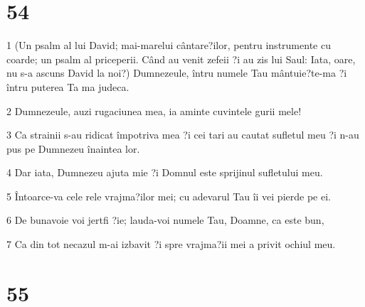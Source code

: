 \chapter{54}

\par 1 (Un psalm al lui David; mai-marelui cântare?ilor, pentru instrumente cu coarde; un psalm al priceperii. Când au venit zefeii ?i au zis lui Saul: Iata, oare, nu s-a ascuns David la noi?) Dumnezeule, întru numele Tau mântuie?te-ma ?i întru puterea Ta ma judeca.
\par 2 Dumnezeule, auzi rugaciunea mea, ia aminte cuvintele gurii mele!
\par 3 Ca strainii s-au ridicat împotriva mea ?i cei tari au cautat sufletul meu ?i n-au pus pe Dumnezeu înaintea lor.
\par 4 Dar iata, Dumnezeu ajuta mie ?i Domnul este sprijinul sufletului meu.
\par 5 Întoarce-va cele rele vrajma?ilor mei; cu adevarul Tau îi vei pierde pe ei.
\par 6 De bunavoie voi jertfi ?ie; lauda-voi numele Tau, Doamne, ca este bun,
\par 7 Ca din tot necazul m-ai izbavit ?i spre vrajma?ii mei a privit ochiul meu.

\chapter{55}


